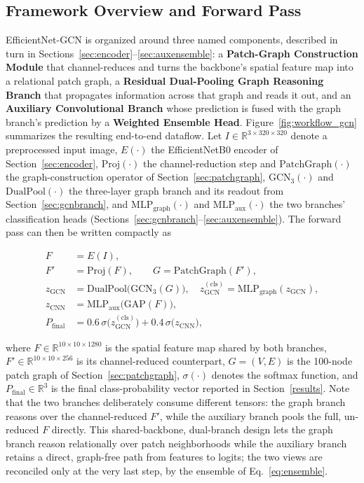 \documentclass[conference]{IEEEtran}
\begin{document}
\subsection{Framework Overview and Forward Pass}
\label{sec:overview}
EfficientNet-GCN is organized around three named components, described in turn in Sections~\ref{sec:encoder}--\ref{sec:auxensemble}: a \textbf{Patch-Graph Construction Module} that channel-reduces and turns the backbone's spatial feature map into a relational patch graph, a \textbf{Residual Dual-Pooling Graph Reasoning Branch} that propagates information across that graph and reads it out, and an \textbf{Auxiliary Convolutional Branch} whose prediction is fused with the graph branch's prediction by a \textbf{Weighted Ensemble Head}. Figure~\ref{fig:workflow_gcn} summarizes the resulting end-to-end dataflow. Let $I \in \mathbb{R}^{3\times320\times320}$ denote a preprocessed input image, $E(\cdot)$ the EfficientNetB0 encoder of Section~\ref{sec:encoder}, $\mathrm{Proj}(\cdot)$ the channel-reduction step and $\mathrm{PatchGraph}(\cdot)$ the graph-construction operator of Section~\ref{sec:patchgraph}, $\mathrm{GCN}_3(\cdot)$ and $\mathrm{DualPool}(\cdot)$ the three-layer graph branch and its readout from Section~\ref{sec:gcnbranch}, and $\mathrm{MLP}_{\text{graph}}(\cdot)$ and $\mathrm{MLP}_{\text{aux}}(\cdot)$ the two branches' classification heads (Sections~\ref{sec:gcnbranch}--\ref{sec:auxensemble}). The forward pass can then be written compactly as

\begingroup
\small
\begin{equation}
\label{eq:forward}
\begin{aligned}
F &= E(I), \\
F' &= \mathrm{Proj}(F), \qquad G = \mathrm{PatchGraph}(F'), \\
z_{\text{GCN}} &= \mathrm{DualPool}\big(\mathrm{GCN}_3(G)\big), \quad z_{\text{GCN}}^{(\text{cls})} = \mathrm{MLP}_{\text{graph}}(z_{\text{GCN}}), \\
z_{\text{CNN}} &= \mathrm{MLP}_{\text{aux}}\big(\mathrm{GAP}(F)\big), \\
P_{\text{final}} &= 0.6\,\sigma\big(z_{\text{GCN}}^{(\text{cls})}\big) + 0.4\,\sigma\big(z_{\text{CNN}}\big),
\end{aligned}
\end{equation}
\endgroup

where $F \in \mathbb{R}^{10\times10\times1280}$ is the spatial feature map shared by both branches, $F' \in \mathbb{R}^{10\times10\times256}$ is its channel-reduced counterpart, $G=(V,E)$ is the 100-node patch graph of Section~\ref{sec:patchgraph}, $\sigma(\cdot)$ denotes the softmax function, and $P_{\text{final}} \in \mathbb{R}^{3}$ is the final class-probability vector reported in Section~\ref{results}. Note that the two branches deliberately consume different tensors: the graph branch reasons over the channel-reduced $F'$, while the auxiliary branch pools the full, un-reduced $F$ directly. This shared-backbone, dual-branch design lets the graph branch reason relationally over patch neighborhoods while the auxiliary branch retains a direct, graph-free path from features to logits; the two views are reconciled only at the very last step, by the ensemble of Eq.~\ref{eq:ensemble}.
\end{document}
